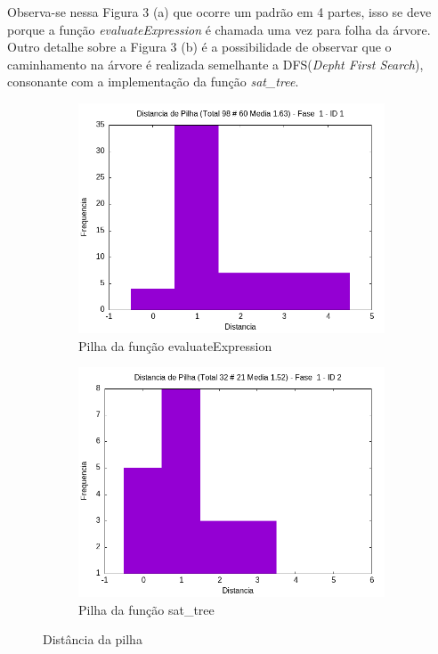\documentclass{article}
\begin{document}
Observa-se nessa Figura 3 (a) que ocorre um padrão em 4 partes, isso se deve porque a função \emph{evaluateExpression} é chamada uma vez para folha da árvore. 
Outro detalhe sobre a Figura 3 (b) é a possibilidade de observar que o caminhamento na árvore é realizada semelhante a DFS(\emph{Depht First Search}), consonante com a implementação da função \emph{sat\_tree}.

\begin{figure}[H]
    \centering
    \hfill
    \begin{subfigure}[c]{0.4\textwidth}
        \centering
        \includegraphics[width=\textwidth]{./images/sat_tree/registro_s-hist-1-1.png}
        \caption{Pilha da função evaluateExpression}
        \label{fig:ac05}
    \end{subfigure}
    \hfill
    \begin{subfigure}[c]{0.4\textwidth}
        \centering
        \includegraphics[width=\textwidth]{./images/sat_tree/registro_s-hist-1-2.png}
        \caption{Pilha da função sat\_tree}
        \label{fig:ac06}
    \end{subfigure}
    \hfill
    \caption{Distância da pilha}
\end{figure}
\end{document}
